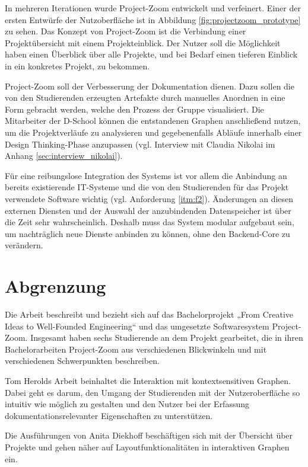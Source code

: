 In mehreren Iterationen wurde Project-Zoom entwickelt und verfeinert. Einer der ersten Entwürfe der Nutzoberfläche ist in Abbildung \ref{fig:projectzoom_prototype} zu sehen. Das Konzept von Project-Zoom ist die Verbindung einer Projektübersicht mit einem Projekteinblick. Der Nutzer soll die Möglichkeit haben einen Überblick über alle Projekte, und bei Bedarf einen tieferen Einblick in ein konkretes Projekt, zu bekommen.

Project-Zoom soll der Verbesserung der Dokumentation dienen. Dazu sollen die von den Studierenden erzeugten \gls{Artefakt}e durch manuelles Anordnen in eine Form gebracht werden, welche den Prozess der Gruppe visualisiert. Die Mitarbeiter der D-School können die entstandenen Graphen anschließend nutzen, um die Projektverläufe zu analysieren und gegebenenfalls Abläufe innerhalb einer Design Thinking-Phase anzupassen (vgl. Interview mit Claudia Nikolai im Anhang \ref{sec:interview_nikolai}).

Für eine reibungslose Integration des Systems ist vor allem die Anbindung an bereits existierende IT-Systeme  und die von den Studierenden für das Projekt verwendete Software wichtig (vgl. Anforderung \ref{itm:f2}). Änderungen an diesen externen Diensten und der Auswahl der anzubindenden Datenspeicher ist über die Zeit sehr wahrscheinlich. Deshalb muss das System modular aufgebaut sein, um nachträglich neue Dienste anbinden zu können, ohne den \gls{Backend}-Core zu verändern.

\section{Abgrenzung}
Die Arbeit beschreibt und bezieht sich auf das Bachelorprojekt „From Creative Ideas to Well-Founded Engineering“ und das umgesetzte Softwaresystem Project-Zoom. Insgesamt haben sechs Studierende an dem Projekt gearbeitet, die in ihren Bachelorarbeiten Project-Zoom aus verschiedenen Blickwinkeln und mit verschiedenen Schwerpunkten beschreiben.

Tom Herolds Arbeit \cite{bp-tomh} beinhaltet die Interaktion mit kontextsensitiven Graphen. Dabei geht es darum, den Umgang der Studierenden mit der Nutzeroberfläche so intuitiv wie möglich zu gestalten und den Nutzer bei der Erfassung dokumentationsrelevanter Eigenschaften zu unterstützen.

Die Ausführungen von Anita Diekhoff \cite{bp-anita}  beschäftigen sich mit der Übersicht über Projekte und gehen näher auf Layoutfunktionalitäten in interaktiven Graphen ein.

